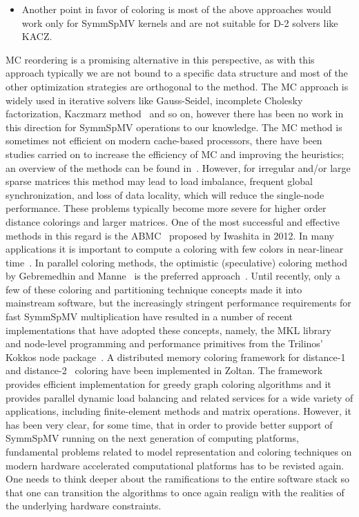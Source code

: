 \begin{itemize}
	\item Another point in favor of coloring is most of the above approaches would work only for \acrshort{SymmSpMV} kernels and are not suitable for D-2 solvers like KACZ.
\end{itemize}
\Acrfull{MC}
reordering is a promising alternative in this perspective, as with this approach 
typically we are not bound to a specific data structure and most of the
other optimization strategies are orthogonal to the method. The \acrshort{MC} approach
is widely used in iterative solvers like Gauss-Seidel, incomplete 
Cholesky factorization, Kaczmarz method~\cite{RBGS,MC,feast_mc} and so on,
 however there has been no work in this direction for \acrshort{SymmSpMV} 
 operations to our knowledge.
The \acrshort{MC} method is sometimes not efficient on modern cache-based
processors, there have been studies carried on to increase the
efficiency of \acrshort{MC} and
improving the heuristics; an overview of the methods can be found
in~\cite{dist_k_def,COLPACK,equitable_color}. However, 
for irregular and/or large sparse 
matrices this method may lead to load imbalance, frequent global synchronization, 
and loss of data locality, which will reduce the single-node performance. 
These problems typically become more severe for higher order distance
colorings and larger matrices.
One of the most
successful and effective methods in this regard is
the \acrfull{ABMC}~\cite{ABMC} proposed by Iwashita \etal in 2012. In
many applications it is important to compute a coloring with few
colors in near-linear time~\cite{doi:10.1137/13093426X}.
 In parallel coloring methods, the optimistic (speculative) coloring method by Gebremedhin
and Manne~\cite{gebremedhin2000scalable} is the preferred
approach~\cite{Boman:2016}.  Until recently, only a few of these
coloring and partitioning technique concepts made it into mainstream
software, but the increasingly stringent performance requirements for
fast \acrshort{SymmSpMV} multiplication have resulted in a number of recent
implementations that have adopted these concepts, namely,
the \acrshort{MKL} library~\cite{MKL} and node-level programming and
performance primitives from the Trilinos' Kokkos node
package~\cite{kokkos}. A distributed memory coloring framework for
distance-1~\cite{BOZDAG2008515} and
distance-2~\cite{doi:10.1137/080732158} coloring have been implemented
in Zoltan. The framework provides efficient implementation for greedy
graph coloring algorithms and it provides parallel dynamic load
balancing and related services for a wide variety of applications,
including finite-element methods and matrix operations.  
%
However, it has been very clear, for some time, that in order to provide better
support of \acrshort{SymmSpMV} running on the next generation of
computing platforms, fundamental problems related to model
representation and coloring techniques on modern hardware accelerated
computational platforms has to be revisted again. One needs to think
deeper about the ramifications to the entire software stack so
that one can transition the algorithms to once again realign with the
realities of the underlying hardware constraints. 

